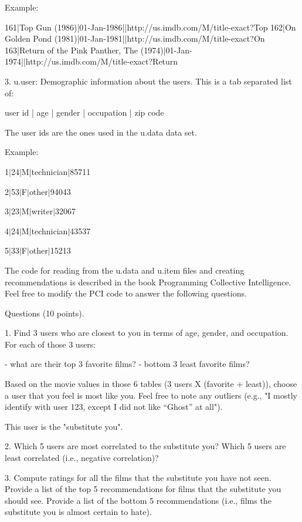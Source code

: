 \documentclass[a4paper, 11pt]{article}
\begin{document}
Example:

161|Top Gun (1986)|01-Jan-1986||http://us.imdb.com/M/title-exact?Top%
162|On Golden Pond (1981)|01-Jan-1981||http://us.imdb.com/M/title-exact?On%
163|Return of the Pink Panther, The (1974)|01-Jan-1974||http://us.imdb.com/M/title-exact?Return%

3.  u.user: Demographic information about the users. This is a tab
separated list of:

user id | age | gender | occupation | zip code

The user ids are the ones used in the u.data data set.

Example:

1$|$24$|$M$|$technician$|$85711 

2$|$53$|$F$|$other$|$94043 

3$|$23$|$M$|$writer$|$32067 

4$|$24$|$M$|$technician$|$43537 

5$|$33$|$F$|$other$|$15213

The code for reading from the u.data and u.item files and creating
recommendations is described in the book Programming Collective
Intelligence.  Feel free to modify the PCI code to answer the 
following questions.

Questions (10 points).

1.  Find 3 users who are closest to you in terms of age, 
gender, and occupation.  For each of those 3 users:

- what are their top 3 favorite films?
- bottom 3 least favorite films?

Based on the movie values in those 6 tables (3 users X (favorite +
least)), choose a user that you feel is most like you.  Feel 
free to note any outliers (e.g., "I mostly identify with user 123,
except I did not like ``Ghost'' at all").  

This user is the "substitute you".  

2.  Which 5 users are most correlated to the substitute you? Which
5 users are least correlated (i.e., negative correlation)?

3.  Compute ratings for all the films that the substitute you
have not seen.  Provide a list of the top 5 recommendations for films
that the substitute you should see.  Provide a list of the bottom
5 recommendations (i.e., films the substitute you is almost certain
to hate).
\end{document}
